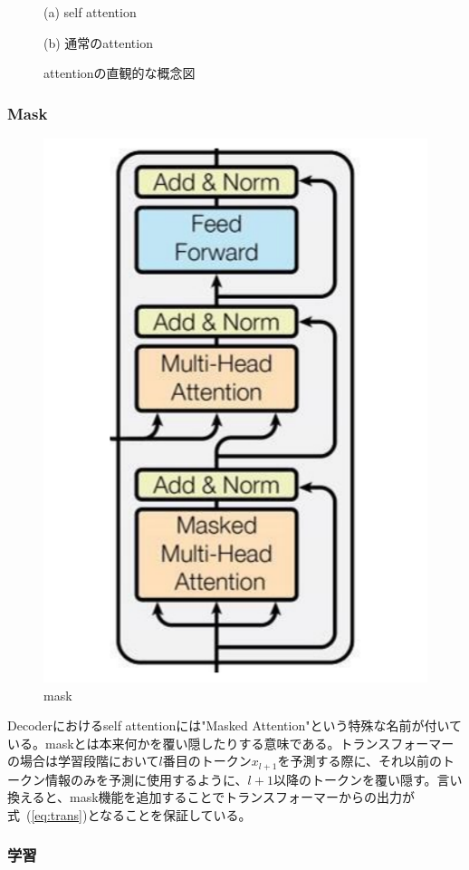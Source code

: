 \begin{figure}
  \centering

    (a) self attention
    \vspace{5mm}

    (b) 通常のattention

  \caption{attentionの直観的な概念図}
\label{fig:att-abs}
\end{figure}



\subsubsection{Mask}

\begin{figure}
  \centering
  \includegraphics[width=0.5\linewidth]{fig/decoder.pdf}
  \caption{mask}
\label{fig:mask}
\end{figure}

Decoderにおけるself attentionには"Masked Attention"という特殊な名前が付いている。maskとは本来何かを覆い隠したりする意味である。トランスフォーマーの場合は学習段階において$l$番目のトークン$x_{l+1}$を予測する際に、それ以前のトークン情報のみを予測に使用するように、$l+1$以降のトークンを覆い隠す。言い換えると、mask機能を追加することでトランスフォーマーからの出力が式~(\ref{eq:trans})となることを保証している。

\subsubsection{学習}

